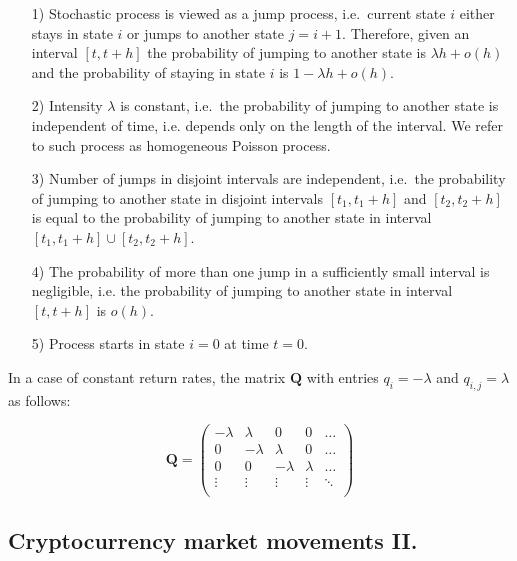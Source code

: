 \begin{itemize}
\item [1)] Stochastic process is viewed as a jump process, i.e.\ current state $i$ either stays in state $i$ or jumps to another state $j=i+1$. Therefore, given an interval $[t,t+h]$ the probability of jumping to another state is $\lambda h + o(h)$ and the probability of staying in state $i$ is $1-\lambda h + o(h)$.
\item [2)] Intensity $\lambda$ is constant, i.e.\ the probability of jumping to another state is independent of time, i.e. depends only on the length of the interval. We refer to such process as homogeneous Poisson process.
\item [3)] Number of jumps in disjoint intervals are independent, i.e.\ the probability of jumping to another state in disjoint intervals $[t_1,t_1+h]$ and $[t_2,t_2+h]$ is equal to the probability of jumping to another state in interval $[t_1,t_1+h] \cup [t_2,t_2+h]$.
\item [4)] The probability of more than one jump in a sufficiently small interval is negligible, i.e. the probability of jumping to another state in interval $[t,t+h]$ is $o(h)$.
\item [5)] Process starts in state $i=0$ at time $t=0$.
\end{itemize}

In a case of constant return rates, the matrix $\textbf{Q}$ with entries $q_{i} = - \lambda$ and $q_{i,j} = \lambda$ as follows:

\begin{equation}
    \textbf{Q} = 
    \begin{pmatrix}
    -\lambda & \lambda & 0 & 0 & \ldots \\
    0 & -\lambda & \lambda & 0 & \ldots \\
    0 & 0 & -\lambda & \lambda & \ldots \\
    \vdots & \vdots & \vdots & \vdots & \ddots \\
    \end{pmatrix}
\end{equation}

\subsection{Cryptocurrency market movements II.}